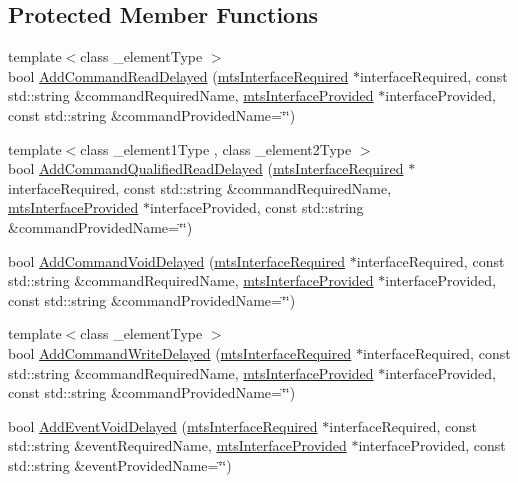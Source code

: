 \subsection*{Protected Member Functions}
\begin{DoxyCompactItemize}
\item 
{\footnotesize template$<$class \-\_\-element\-Type $>$ }\\bool \hyperlink{classmts_component_add_latency_ac6dee3c262dba3445e4ba73c5e1b9b4f}{Add\-Command\-Read\-Delayed} (\hyperlink{classmts_interface_required}{mts\-Interface\-Required} $\ast$interface\-Required, const std\-::string \&command\-Required\-Name, \hyperlink{classmts_interface_provided}{mts\-Interface\-Provided} $\ast$interface\-Provided, const std\-::string \&command\-Provided\-Name=\char`\"{}\char`\"{})
\item 
{\footnotesize template$<$class \-\_\-element1\-Type , class \-\_\-element2\-Type $>$ }\\bool \hyperlink{classmts_component_add_latency_acacec8748b88ec97306699676c5afdf9}{Add\-Command\-Qualified\-Read\-Delayed} (\hyperlink{classmts_interface_required}{mts\-Interface\-Required} $\ast$interface\-Required, const std\-::string \&command\-Required\-Name, \hyperlink{classmts_interface_provided}{mts\-Interface\-Provided} $\ast$interface\-Provided, const std\-::string \&command\-Provided\-Name=\char`\"{}\char`\"{})
\item 
bool \hyperlink{classmts_component_add_latency_a07896e9c13691b24e03a4be8850eb73b}{Add\-Command\-Void\-Delayed} (\hyperlink{classmts_interface_required}{mts\-Interface\-Required} $\ast$interface\-Required, const std\-::string \&command\-Required\-Name, \hyperlink{classmts_interface_provided}{mts\-Interface\-Provided} $\ast$interface\-Provided, const std\-::string \&command\-Provided\-Name=\char`\"{}\char`\"{})
\item 
{\footnotesize template$<$class \-\_\-element\-Type $>$ }\\bool \hyperlink{classmts_component_add_latency_aa9ab4ddcf79bcb8497f9af24a3af99c7}{Add\-Command\-Write\-Delayed} (\hyperlink{classmts_interface_required}{mts\-Interface\-Required} $\ast$interface\-Required, const std\-::string \&command\-Required\-Name, \hyperlink{classmts_interface_provided}{mts\-Interface\-Provided} $\ast$interface\-Provided, const std\-::string \&command\-Provided\-Name=\char`\"{}\char`\"{})
\item 
bool \hyperlink{classmts_component_add_latency_aeee9bc6dc807fb6cb6b3354ddc2883d2}{Add\-Event\-Void\-Delayed} (\hyperlink{classmts_interface_required}{mts\-Interface\-Required} $\ast$interface\-Required, const std\-::string \&event\-Required\-Name, \hyperlink{classmts_interface_provided}{mts\-Interface\-Provided} $\ast$interface\-Provided, const std\-::string \&event\-Provided\-Name=\char`\"{}\char`\"{})

\end{DoxyCompactItemize}
